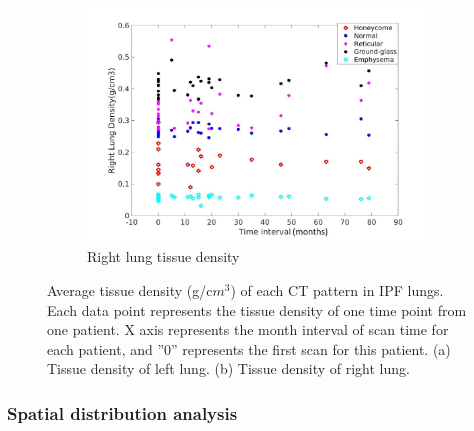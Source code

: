 \begin{figure}[H]
\begin{subfigure}{.7\linewidth}
  \includegraphics[width=\linewidth,trim={{.0\wd0} {.0\wd0} {.0\wd0} {.0\wd0}},clip]{QuantitativeAnalysis/Image/RightLungDensity.jpg}
  \caption{Right lung tissue density}
  \label{fig:LungDensity-b} 
\end{subfigure}
\caption{Average tissue density (g/c$m^3$) of each CT pattern in IPF lungs. Each data point represents the tissue density of one time point from one patient. X axis represents the month interval of scan time for each patient, and ''0'' represents the first scan for this patient. (a) Tissue density of left lung. (b) Tissue density of right lung.}
\label{fig:LungDensity}
\end{figure}

\subsubsection{Spatial distribution analysis}
